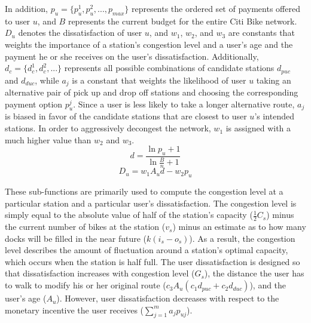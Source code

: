 \documentclass[times, 10pt,twocolumn]{article}
\begin{document}
In addition, $p_u = \{p_u^1, p_u^2, ..., p_{max}\}$ represents the ordered set of payments offered to user $u$, and $B$ represents the current budget for the entire Citi Bike network.
$D_u$ denotes the dissatisfaction of user $u$, and $w_1$, $w_2$, and $w_3$ are constants that weights the importance of a station's congestion level and a user's age and the payment he or she receives on the user's dissatisfaction. Additionally, $d_c = \{d_c^1, d_c^2, ...\}$ represents all possible combinations of candidate stations $d_{puc}$ and $d_{duc}$, while $a_j$ is a constant that weights the likelihood of user $u$ taking an alternative pair of pick up and drop off stations and choosing the corresponding payment option $p_u^j$. Since a user is less likely to take a longer alternative route, $a_j$ is biased in favor of the candidate stations that are closest to user $u$'s intended stations. In order to aggressively decongest the network, $w_1$ is assigned with a much higher value than $w_2$ and $w_3$.
\begin{equation}
d = \frac{\ln{p_u+1}}{\ln{\frac{B}{n}+1}}
\end{equation}
\begin{equation}
D_u = w_1A_ud - w_2p_u
\end{equation}

These sub-functions are primarily used to compute the congestion level at a particular station and a particular user's dissatisfaction. The congestion level is simply equal to the absolute value of half of the station's capacity ($\frac{1}{2}C_s$) minus the current number of bikes at the station ($v_s$) minus an estimate as to how many docks will be filled in the near future ($k(i_s - o_s)$). As a result, the congestion level describes the amount of fluctuation around a station's optimal capacity, which occurs when the station is half full. The user dissatisfaction is designed so that dissatisfaction increases with congestion level ($G_s$), the distance the user has to walk to modify his or her original route ($c_3A_u(c_1d_{puc} + c_2d_{duc})$), and the user's age ($A_u$). However, user dissatisfaction decreases with respect to the monetary incentive the user receives ($\sum_{j=1}^{m}a_jp_{uj}$).
\end{document}
